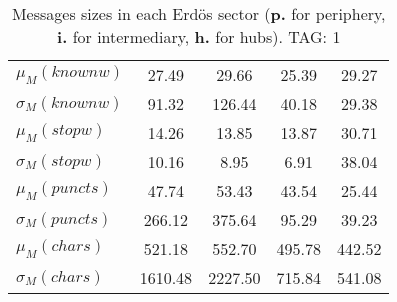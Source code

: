 \begin{table}[h!]
\begin{center}
\begin{tabular}{| l || c | c | c | c |}
$\mu_M(knownw)$ & 27.49  & 29.66  & 25.39  & 29.27 \\
$\sigma_M(knownw)$ & 91.32  & 126.44  & 40.18  & 29.38 \\\hline
$\mu_M(stopw)$ & 14.26  & 13.85  & 13.87  & 30.71 \\
$\sigma_M(stopw)$ & 10.16  & 8.95  & 6.91  & 38.04 \\\hline
$\mu_M(puncts)$ & 47.74  & 53.43  & 43.54  & 25.44 \\
$\sigma_M(puncts)$ & 266.12  & 375.64  & 95.29  & 39.23 \\\hline
$\mu_M(chars)$ & 521.18  & 552.70  & 495.78  & 442.52 \\
$\sigma_M(chars)$ & 1610.48  & 2227.50  & 715.84  & 541.08 \\\hline
\end{tabular}
\caption{Messages sizes in each Erd\"os sector ({{\bf p.}} for periphery, {{\bf i.}} for intermediary, {{\bf h.}} for hubs). TAG: 1}
\end{center}
\end{table}
